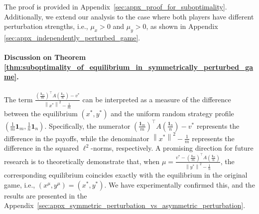 \documentclass{article}
\newcommand{\bone}{\mathbf{1}}
\theoremstyle{plain}
\begin{document}
The proof is provided in Appendix~\ref{sec:appx_proof_for_suboptimality}. Additionally, we extend our analysis to the case where both players have different perturbation strengths, i.e., \( \mu_x > 0 \) and \( \mu_y > 0 \), as shown in Appendix \ref{sec:appx_independently_perturbed_game}.


\paragraph{Discussion on Theorem \ref{thm:suboptimality_of_equilibrium_in_symmetrically_perturbed_game}.}
The term $\frac{\left(\frac{\bone_m}{m}\right)^{\top}A\left(\frac{\bone_n}{n}\right) - v^{\ast}}{\left\|x^{\ast}\right\|^2 - \frac{1}{m}}$ can be interpreted as a measure of the difference between the equilibrium $(x^{\ast}, y^{\ast})$ and the uniform random strategy profile $(\frac{1}{m}\bone_m, \frac{1}{n}\bone_n)$.
Specifically, the numerator $\left(\frac{\bone_m}{m}\right)^{\top}A\left(\frac{\bone_n}{n}\right) - v^{\ast}$ represents the difference in the payoffs, while the denominator $\left\|x^{\ast}\right\|^2 - \frac{1}{m}$ represents the difference in the squared $\ell^2$-norms, respectively.
A promising direction for future research is to theoretically demonstrate that, when $\mu = \frac{v^{\ast} - \left(\frac{\bone_m}{m}\right)^{\top}A\left(\frac{\bone_n}{n}\right)}{\left\|y^{\ast}\right\|^2 - \frac{1}{n}}$, the corresponding equilibrium coincides exactly with the equilibrium in the original game, i.e., $(x^\mu, y^\mu) = (x^*, y^*)$.
We have experimentally confirmed this, and the results are presented in the Appendix~\ref{sec:appx_symmetric_perturbation_vs_asymmetric_perturbation}.
\end{document}
